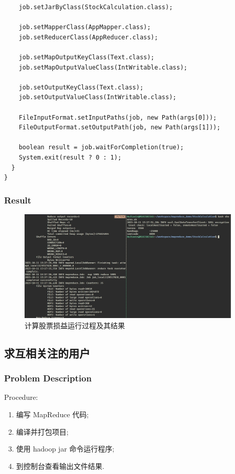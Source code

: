 \documentclass{article}
\begin{document}
\begin{center}
\begin{verbatim}
    job.setJarByClass(StockCalculation.class);

    job.setMapperClass(AppMapper.class);
    job.setReducerClass(AppReducer.class);

    job.setMapOutputKeyClass(Text.class);
    job.setMapOutputValueClass(IntWritable.class);

    job.setOutputKeyClass(Text.class);
    job.setOutputValueClass(IntWritable.class);

    FileInputFormat.setInputPaths(job, new Path(args[0]));
    FileOutputFormat.setOutputPath(job, new Path(args[1]));

    boolean result = job.waitForCompletion(true);
    System.exit(result ? 0 : 1);
  }
}
\end{verbatim}
    \end{center}

    \subsubsection{Result}

    \begin{figure}[H]
      \begin{center}
        \includegraphics[width=0.95\textwidth]{./figures/2.jpg}
      \end{center}
      \caption{计算股票损益运行过程及其结果}
    \end{figure}

    \subsection{求互相关注的用户}

    \subsubsection{Problem Description}

    \noindent Procedure:
    \begin{enumerate}
      \item 编写 MapReduce 代码;
      \item 编译并打包项目;
      \item 使用 hadoop jar 命令运行程序;
      \item 到控制台查看输出文件结果.
    \end{enumerate}
\end{document}
